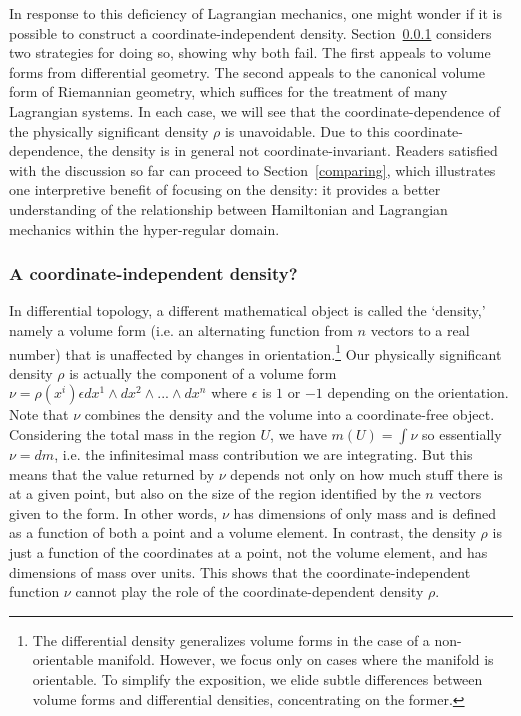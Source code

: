 \documentclass[letterpaper]{article}
\begin{document}
In response to this deficiency of Lagrangian mechanics, one might wonder if it is possible to construct a coordinate-independent density. Section~\ref{independence} considers two strategies for doing so, showing why both fail. The first appeals to volume forms from differential geometry. The second appeals to the canonical volume form of Riemannian geometry, which suffices for the treatment of many Lagrangian systems. In each case, we will see that the coordinate-dependence of the physically significant density $\rho$ is unavoidable. Due to this coordinate-dependence, the density is in general not coordinate-invariant. Readers satisfied with the discussion so far can proceed to Section~\ref{comparing}, which illustrates one interpretive benefit of focusing on the density: it provides a better understanding of the relationship between Hamiltonian and Lagrangian mechanics within the hyper-regular domain.

\subsubsection{A coordinate-independent density?}
\label{independence}

In differential topology, a different mathematical object is called the `density,' namely a volume form (i.e. an alternating function from $n$ vectors to a real number) that is unaffected by changes in orientation.\footnote{The differential density generalizes volume forms in the case of a non-orientable manifold. However, we focus only on cases where the manifold is orientable. To simplify the exposition, we elide subtle differences between volume forms and differential densities, concentrating on the former.} Our physically significant density $\rho$ is actually the component of a volume form $\nu = \rho(x^i)  \epsilon dx^1 \wedge dx^2 \wedge ... \wedge dx^n$ where $\epsilon$ is $1$ or $-1$ depending on the orientation. Note that $\nu$ combines the density and the volume into a coordinate-free object. Considering the total mass in the region $U$, we have $m(U) = \int \nu$ so essentially $\nu = dm$, i.e. the infinitesimal mass contribution we are integrating. But this means that the value returned by $\nu$ depends not only on how much stuff there is at a given point, but also on the size of the region identified by the $n$ vectors given to the form. In other words, $\nu$ has dimensions of only mass and is defined as a function of both a point and a volume element. In contrast, the density $\rho$ is just a function of the coordinates at a point, not the volume element, and has dimensions of mass over units. This shows that the coordinate-independent function $\nu$ cannot play the role of the coordinate-dependent density $\rho$. 
\end{document}
